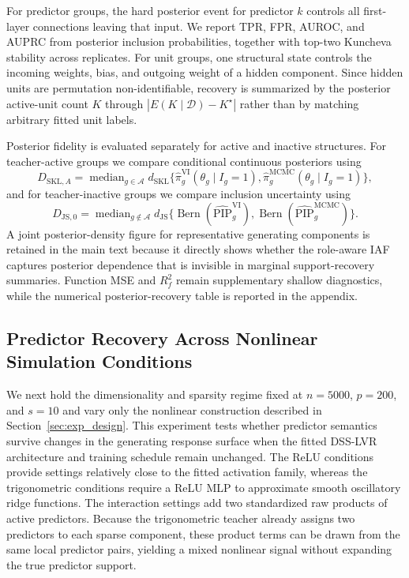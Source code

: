For predictor groups, the hard posterior event for predictor $k$ controls all first-layer connections leaving that input. We report TPR, FPR, AUROC, and AUPRC from posterior inclusion probabilities, together with top-two Kuncheva stability across replicates. For unit groups, one structural state controls the incoming weights, bias, and outgoing weight of a hidden component. Since hidden units are permutation non-identifiable, recovery is summarized by the posterior active-unit count $K$ through $|E(K\mid\mathcal D)-K^\star|$ rather than by matching arbitrary fitted unit labels.

Posterior fidelity is evaluated separately for active and inactive structures. For teacher-active groups we compare conditional continuous posteriors using
\[
D_{\mathrm{SKL},A}=\operatorname{median}_{g\in\mathcal A}
 d_{\mathrm{SKL}}\{\widehat\pi_g^{\mathrm{VI}}(\theta_g\mid I_g=1),
 \widehat\pi_g^{\mathrm{MCMC}}(\theta_g\mid I_g=1)\},
\]
and for teacher-inactive groups we compare inclusion uncertainty using
\[
D_{\mathrm{JS},0}=\operatorname{median}_{g\notin\mathcal A}
 d_{\mathrm{JS}}\{\operatorname{Bern}(\widehat{\mathrm{PIP}}_g^{\mathrm{VI}}),
 \operatorname{Bern}(\widehat{\mathrm{PIP}}_g^{\mathrm{MCMC}})\}.
\]
A joint posterior-density figure for representative generating components is retained in the main text because it directly shows whether the role-aware IAF captures posterior dependence that is invisible in marginal support-recovery summaries. Function MSE and $R_f^2$ remain supplementary shallow diagnostics, while the numerical posterior-recovery table is reported in the appendix.

\subsection{Predictor Recovery Across Nonlinear Simulation Conditions}
\label{sec:selection_conditions}

We next hold the dimensionality and sparsity regime fixed at $n=5000$, $p=200$, and $s=10$ and vary only the nonlinear construction described in Section~\ref{sec:exp_design}. This experiment tests whether predictor semantics survive changes in the generating response surface when the fitted DSS-LVR architecture and training schedule remain unchanged. The ReLU conditions provide settings relatively close to the fitted activation family, whereas the trigonometric conditions require a ReLU MLP to approximate smooth oscillatory ridge functions. The interaction settings add two standardized raw products of active predictors. Because the trigonometric teacher already assigns two predictors to each sparse component, these product terms can be drawn from the same local predictor pairs, yielding a mixed nonlinear signal without expanding the true predictor support.

